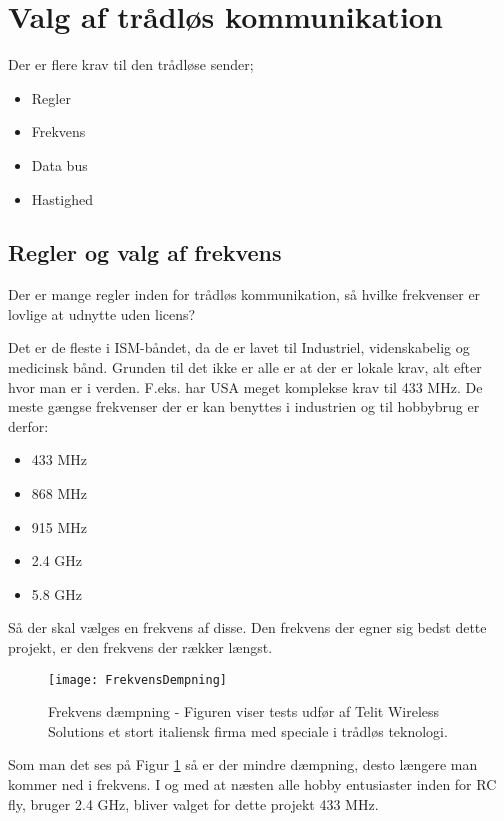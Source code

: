 \documentclass[Main]{subfiles}
\begin{document}
\section{Valg af trådløs kommunikation}

Der er flere krav til den trådløse sender;

\begin{itemize}
\item Regler
\item Frekvens
\item Data bus
\item Hastighed
\end{itemize}

\subsection{Regler og valg af frekvens}
Der er mange regler inden for trådløs kommunikation, så hvilke frekvenser er lovlige at udnytte uden licens?

Det er de fleste i ISM-båndet, da de er lavet til  Industriel, videnskabelig og medicinsk bånd. 
Grunden til det ikke er alle er at der er lokale krav, alt efter hvor man er i verden. 
F.eks. har USA meget komplekse krav til 433 MHz\cite[s. 32]{Lov1}.
De meste gængse frekvenser der er kan benyttes i industrien og til hobbybrug er derfor:

\begin{itemize}
\item 433 MHz
\item 868 MHz
\item 915 MHz
\item 2.4 GHz
\item 5.8 GHz
\end{itemize}

Så der skal vælges en frekvens af disse.
Den frekvens der egner sig bedst dette projekt, er den frekvens der rækker længst. 

\begin{figure}[H]
\centering
\texttt{[image: FrekvensDempning]}
\caption{Frekvens dæmpning - Figuren viser tests udfør af Telit Wireless Solutions\cite[s. 43]{Telit} et stort italiensk firma med speciale i trådløs teknologi.}
\label{Fig:dempning}
\end{figure}


Som man det ses på Figur \ref{Fig:dempning} så er der mindre dæmpning, desto længere man kommer ned i frekvens.
I og med at næsten alle hobby entusiaster inden for RC fly, bruger 2.4 GHz, bliver valget for dette projekt 433 MHz.
\end{document}
